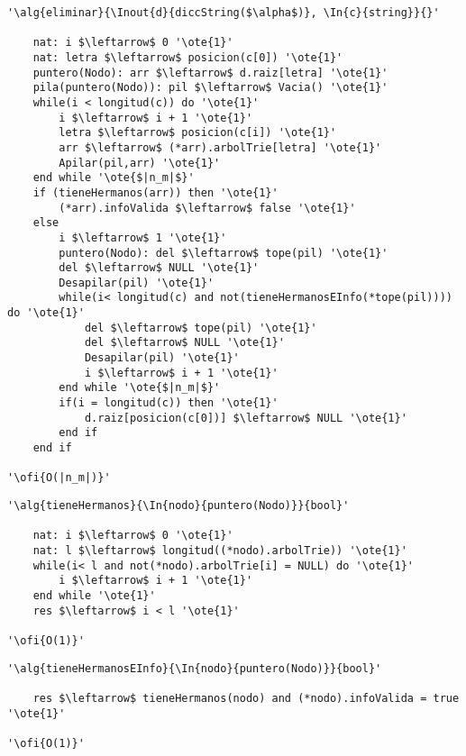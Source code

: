 \begin{lstlisting}[mathescape]
'\alg{eliminar}{\Inout{d}{diccString($\alpha$)}, \In{c}{string}}{}'

	nat: i $\leftarrow$ 0 '\ote{1}'
	nat: letra $\leftarrow$ posicion(c[0]) '\ote{1}'
	puntero(Nodo): arr $\leftarrow$ d.raiz[letra] '\ote{1}'
	pila(puntero(Nodo)): pil $\leftarrow$ Vacia() '\ote{1}'
	while(i < longitud(c)) do '\ote{1}'
		i $\leftarrow$ i + 1 '\ote{1}'
		letra $\leftarrow$ posicion(c[i]) '\ote{1}'
		arr $\leftarrow$ (*arr).arbolTrie[letra] '\ote{1}'
		Apilar(pil,arr) '\ote{1}'
	end while '\ote{$|n_m|$}'
	if (tieneHermanos(arr)) then '\ote{1}'
		(*arr).infoValida $\leftarrow$ false '\ote{1}'
	else
		i $\leftarrow$ 1 '\ote{1}'
		puntero(Nodo): del $\leftarrow$ tope(pil) '\ote{1}'
		del $\leftarrow$ NULL '\ote{1}'
		Desapilar(pil) '\ote{1}'
		while(i< longitud(c) and not(tieneHermanosEInfo(*tope(pil)))) do '\ote{1}'
			del $\leftarrow$ tope(pil) '\ote{1}'
			del $\leftarrow$ NULL '\ote{1}'
			Desapilar(pil) '\ote{1}'
			i $\leftarrow$ i + 1 '\ote{1}'
		end while '\ote{$|n_m|$}'
		if(i = longitud(c)) then '\ote{1}'
			d.raiz[posicion(c[0])] $\leftarrow$ NULL '\ote{1}'
		end if
	end if

'\ofi{O(|n_m|)}'

\end{lstlisting}

\begin{lstlisting}[mathescape]
'\alg{tieneHermanos}{\In{nodo}{puntero(Nodo)}}{bool}'

	nat: i $\leftarrow$ 0 '\ote{1}'
	nat: l $\leftarrow$ longitud((*nodo).arbolTrie)) '\ote{1}'
	while(i< l and not(*nodo).arbolTrie[i] = NULL) do '\ote{1}'
		i $\leftarrow$ i + 1 '\ote{1}'
	end while '\ote{1}' 
	res $\leftarrow$ i < l '\ote{1}'

'\ofi{O(1)}'

\end{lstlisting}

\begin{lstlisting}[mathescape]
'\alg{tieneHermanosEInfo}{\In{nodo}{puntero(Nodo)}}{bool}'

	res $\leftarrow$ tieneHermanos(nodo) and (*nodo).infoValida = true '\ote{1}'

'\ofi{O(1)}'

\end{lstlisting}

